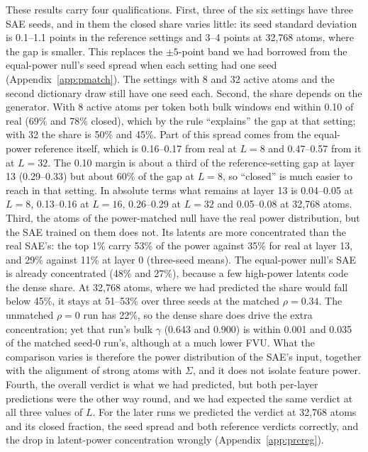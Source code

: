 \documentclass{article}
\newcommand{\Sig}{\Sigma}
\begin{document}
These results carry four qualifications. First, three of the six settings have three SAE seeds, and in them the closed share varies little: its seed standard deviation is 0.1--1.1 points in the reference settings and 3--4 points at 32,768 atoms, where the gap is smaller. This replaces the $\pm 5$-point band we had borrowed from the equal-power null's seed spread when each setting had one seed (Appendix~\ref{app:pmatch}). The settings with 8 and 32 active atoms and the second dictionary draw still have one seed each. Second, the share depends on the generator. With 8 active atoms per token both bulk windows end within 0.10 of real (69\% and 78\% closed), which by the rule ``explains'' the gap at that setting; with 32 the share is 50\% and 45\%. Part of this spread comes from the equal-power reference itself, which is 0.16--0.17 from real at $L=8$ and 0.47--0.57 from it at $L=32$. The 0.10 margin is about a third of the reference-setting gap at layer 13 (0.29--0.33) but about 60\% of the gap at $L=8$, so ``closed'' is much easier to reach in that setting. In absolute terms what remains at layer 13 is 0.04--0.05 at $L=8$, 0.13--0.16 at $L=16$, 0.26--0.29 at $L=32$ and 0.05--0.08 at 32,768 atoms. Third, the atoms of the power-matched null have the real power distribution, but the SAE trained on them does not. Its latents are more concentrated than the real SAE's: the top 1\% carry 53\% of the power against 35\% for real at layer 13, and 29\% against 11\% at layer 0 (three-seed means). The equal-power null's SAE is already concentrated (48\% and 27\%), because a few high-power latents code the dense share. At 32,768 atoms, where we had predicted the share would fall below 45\%, it stays at 51--53\% over three seeds at the matched $\rho=0.34$. The unmatched $\rho=0$ run has 22\%, so the dense share does drive the extra concentration; yet that run's bulk $\gamma$ (0.643 and 0.900) is within 0.001 and 0.035 of the matched seed-0 run's, although at a much lower FVU. What the comparison varies is therefore the power distribution of the SAE's input, together with the alignment of strong atoms with $\Sig$, and it does not isolate feature power. Fourth, the overall verdict is what we had predicted, but both per-layer predictions were the other way round, and we had expected the same verdict at all three values of $L$. For the later runs we predicted the verdict at 32,768 atoms and its closed fraction, the seed spread and both reference verdicts correctly, and the drop in latent-power concentration wrongly (Appendix~\ref{app:prereg}).
\end{document}
